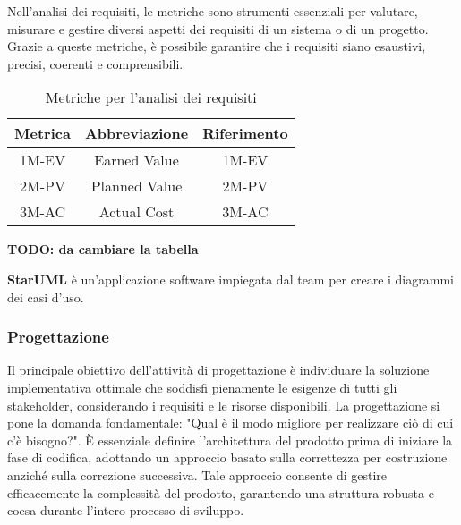 Nell'analisi dei requisiti, le metriche sono strumenti essenziali per valutare, misurare e gestire diversi aspetti dei requisiti di un sistema o di un progetto. Grazie a queste metriche, è possibile garantire che i requisiti siano esaustivi, precisi, coerenti e comprensibili.

\begin{table}[!h]
    \centering
    \begin{tabular}{|c|c|c|}
    \hline
    \textbf{Metrica} & \textbf{Abbreviazione} & \textbf{Riferimento} \\
    \hline
    1M-EV & Earned Value & 1M-EV \\
    2M-PV & Planned Value & 2M-PV\\
    3M-AC & Actual Cost & 3M-AC \\
    \hline
    \end{tabular}
    \caption{Metriche per l'analisi dei requisiti}
    \label{tab:2}
\end{table}
\textbf{TODO: da cambiare la tabella}

\textbf{StarUML} è un'applicazione software impiegata dal team per creare i diagrammi dei casi d'uso.


\subsubsection{Progettazione}
Il principale obiettivo dell'attività di progettazione è individuare la soluzione implementativa ottimale che soddisfi pienamente le esigenze di tutti gli stakeholder, considerando i requisiti e le risorse disponibili. La progettazione si pone la domanda fondamentale: "Qual è il modo migliore per realizzare ciò di cui c'è bisogno?". È essenziale definire l'architettura del prodotto prima di iniziare la fase di codifica, adottando un approccio basato sulla correttezza per costruzione anziché sulla correzione successiva. Tale approccio consente di gestire efficacemente la complessità del prodotto, garantendo una struttura robusta e coesa durante l'intero processo di sviluppo.

